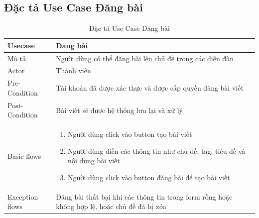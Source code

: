 \documentclass[../index.tex]{subfiles}
\begin{document}
    \subsection{Đặc tả Use Case Đăng bài}
    \begin{table}[H]
        \centering
        {}
        \begin{tabular}{ |p{3cm}|p{9cm}| }
            \hline
            Usecase         & Đăng bài                                                                                                                                                                                                                      \\
            \hline
            Mô tả           & Người dùng có thể đăng bài lên chủ đề trong các diễn đàn                                                                                                                                                                      \\
            \hline
            Actor           & Thành viên                                                                                                                                                                                                                    \\
            \hline
            Pre-Condition   & Tài khoản đã được xác thực và được cấp quyền đăng bài viết                                                                                                                                                                    \\
            \hline
            Post-Condition  & Bài viết sẽ được hệ thống lưu lại và xử lý                                                                                                                                                                                    \\
            \hline
            Basic flows     & \begin{enumerate}\item Người dùng click vào button tạo bài viết

\item Người dùng điền các thông tin như chủ đề, tag, tiêu đề và nội dung bài viết

\item Người dùng click vào button đăng bài để tạo bài viết\end{enumerate} \\
            \hline
            Exception flows & Đăng bài thất bại khi các thông tin trong form rỗng hoặc không hợp lệ, hoặc chủ đề đã bị xóa                                                                                                                                  \\
            \hline
        \end{tabular}
        \caption{Đặc tả Use Case Đăng bài}
    \end{table}
\end{document}
